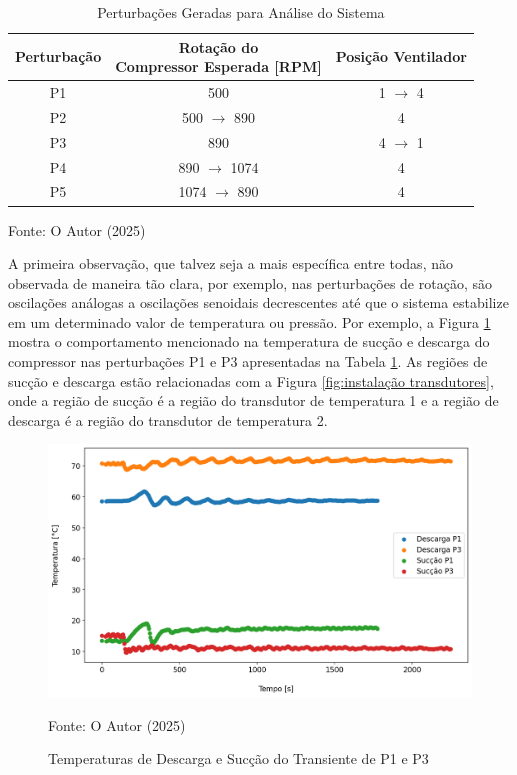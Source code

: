 \begin{table}[htb]
    \centering
    \begin{tabular}{|c|c|c|}
        \hline
        \textbf{Perturbação} & \makecell{\textbf{Rotação do} \\ \textbf{Compressor Esperada [RPM]}} & \textbf{Posição Ventilador}\\      
        \hline
        P1 & 500 & 1 $\rightarrow$ 4  \\
        P2 & 500 $\rightarrow$ 890 & 4  \\
        P3 & 890 & 4 $\rightarrow$ 1  \\
        P4 & 890 $\rightarrow$ 1074 & 4  \\
        P5 & 1074 $\rightarrow$ 890 & 4  \\
        \hline
    \end{tabular}
    \caption{Perturbações Geradas para Análise do Sistema}
    \vspace{5pt} 
{\footnotesize Fonte: O Autor (2025)}
    \label{tab:posiçõesVentilador}
\end{table}

A primeira observação, que talvez seja a mais específica entre todas, não observada de maneira tão clara, por exemplo, nas perturbações de rotação, são oscilações análogas a oscilações senoidais decrescentes até que o sistema estabilize em um determinado valor de temperatura ou pressão. Por exemplo, a Figura \ref{fig:TempSuccaoPertubacaoVentilador} mostra o comportamento mencionado na temperatura de sucção e descarga do compressor nas perturbações P1 e P3 apresentadas na Tabela \ref{tab:posiçõesVentilador}. As regiões de sucção e descarga estão relacionadas com a Figura \ref{fig:instalação transdutores}, onde a região de sucção é a região do transdutor de temperatura 1 e a região de descarga é a região do transdutor de temperatura 2.
\newpage
\begin{figure}[h]
    \centering
    \includegraphics[width=1\linewidth]{FigurasdoTexto/Temperaturas de descarga e sucção Transiente P1 e P3.png}
    \caption{Temperaturas de Descarga e Sucção do Transiente de P1 e P3}
    \label{fig:TempSuccaoPertubacaoVentilador}
    {\footnotesize Fonte: O Autor (2025)}
\end{figure}

